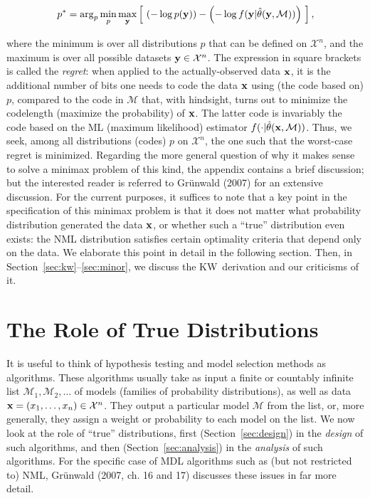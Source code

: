 \documentclass[authoryear]{elsarticle}
\newcommand{\condon}{|}
\newcommand{\model}{\mathcal{M}}
\newcommand{\sspace}[2]{\mathcal{#1}^{#2}}
\newcommand{\kw}{KW}
\newcommand{\vx}{\ensuremath{{\bf x}}}
\newcommand{\vy}{\ensuremath{{\bf y}}}
\begin{document}
\vspace*{-12pt}
\begin{equation}\label{minimax}
p^* = \displaystyle\arg _{p} \min_{p} \max_{\vy}
\left[ \ \left(- \log p(\vy) \right) - \left( - \log f(\vy \condon
  \hat{\theta}(\vy,\model)) \right) \ \right],
\end{equation}

\noindent
where the minimum is over all distributions $p$ that can be defined on
$\sspace{X}{n}$, and the maximum is over all possible datasets $\vy
\in \sspace{X}{n}$. The expression in square brackets is called the
{\em regret\/}: when applied to the actually-observed data $\vx$, it
is the additional number of bits one needs to code the data $\vx$
using (the code based on) $p$, compared to the code in $\model$ that,
with hindsight, turns out to minimize the codelength (maximize the
probability) of $\vx$. The latter code is invariably the code based on
the ML (maximum likelihood) estimator $f(\cdot \condon
\hat{\theta}(\vx,\model))$.  Thus, we seek, among all distributions
(codes) $p$ on $\sspace{X}{n}$, the one such that the worst-case
regret is minimized. Regarding the more general question of why it
makes sense to solve a minimax problem of this kind, the appendix
contains a brief discussion; but the interested reader is referred to
Gr\"unwald (2007) for an extensive discussion. For the current
purposes, it suffices to note that a key point in the specification of
this minimax problem is that it does not matter what probability
distribution generated the data $\vx$, or whether such a ``true''
distribution even exists: the NML distribution satisfies certain
optimality criteria that depend only on the data. We elaborate this
point in detail in the following section. Then, in
Section~\ref{sec:kw}--\ref{sec:minor}, we discuss the \kw\
derivation and our criticisms of it.
\section{The Role of True Distributions}
\label{sec:true}
It is useful to think of hypothesis testing and model selection
methods as algorithms. These algorithms usually take as input a finite
or countably infinite list $\model_1, \model_2, \ldots$ of models
(families of probability distributions), as well as data ${\bf x} =
(x_1, \ldots, x_n) \in {\cal X}^n$. They output a particular model
$\model$ from the list, or, more generally, they assign a weight or
probability to each model on the list.  We now look at the role of
``true'' distributions, first (Section~\ref{sec:design}) in the {\em
  design\/} of such algorithms, and then (Section~\ref{sec:analysis})
in the {\em analysis\/} of such algorithms.  For the specific case of
MDL algorithms such as (but not restricted to) NML, Gr\"unwald (2007,
ch. 16 and 17) discusses these issues in far more detail.
\end{document}
